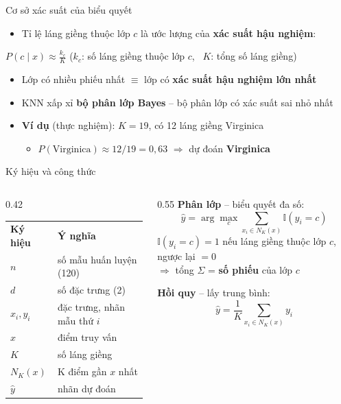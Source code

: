 \documentclass[aspectratio=169,10pt]{beamer}
\newcommand{\hl}[1]{\textcolor{nhan}{\textbf{#1}}}
\newcommand{\hop}[1]{\begin{center}\colorbox{bang}{\parbox{0.92\linewidth}{\centering #1}}\end{center}}
\begin{document}
\begin{frame}{Cơ sở xác suất của biểu quyết}
\begin{itemize}\setlength\itemsep{0.6em}
  \item Tỉ lệ láng giềng thuộc lớp $c$ là ước lượng của \textbf{xác suất hậu nghiệm}:
\end{itemize}
\hop{$\displaystyle P(c \mid x) \approx \frac{k_c}{K}$ \qquad ($k_c$: số láng giềng thuộc lớp $c$, \ $K$: tổng số láng giềng)}
\begin{itemize}\setlength\itemsep{0.6em}
  \item Lớp có nhiều phiếu nhất $\equiv$ lớp có \textbf{xác suất hậu nghiệm lớn nhất}
  \item KNN xấp xỉ \hl{bộ phân lớp Bayes} -- bộ phân lớp có xác suất sai nhỏ nhất
  \item \textbf{Ví dụ} (thực nghiệm): $K = 19$, có 12 láng giềng Virginica
  \begin{itemize}
    \item $P(\text{Virginica}) \approx 12/19 = 0{,}63$ \quad $\Rightarrow$ dự đoán \hl{Virginica}
  \end{itemize}
\end{itemize}
\end{frame}

\begin{frame}{Ký hiệu và công thức}
\begin{columns}[T,totalwidth=\textwidth]
\begin{column}{0.42\textwidth}
\footnotesize
\renewcommand{\arraystretch}{1.25}
\begin{tabular}{@{}ll@{}}
\rowcolor{bang}\textbf{Ký hiệu} & \textbf{Ý nghĩa}\\
$n$ & số mẫu huấn luyện (120)\\
$d$ & số đặc trưng (2)\\
$x_i, y_i$ & đặc trưng, nhãn mẫu thứ $i$\\
$x$ & điểm truy vấn\\
$K$ & số láng giềng\\
$N_K(x)$ & K điểm gần $x$ nhất\\
$\hat y$ & nhãn dự đoán\\
\end{tabular}
\end{column}
\begin{column}{0.55\textwidth}
\textbf{Phân lớp} -- biểu quyết đa số:
\[\hat y = \arg\max_{c} \sum_{x_i \in N_K(x)} \mathbb{I}(y_i = c)\]
\vspace{0.2em}
{\small $\mathbb{I}(y_i = c) = 1$ nếu láng giềng thuộc lớp $c$, ngược lại $= 0$ \\ $\Rightarrow$ tổng $\Sigma$ = \textbf{số phiếu} của lớp $c$}

\vspace{0.6em}
\textbf{Hồi quy} -- lấy trung bình:
\[\hat y = \frac{1}{K}\sum_{x_i \in N_K(x)} y_i\]
\end{column}
\end{columns}
\end{frame}
\end{document}
